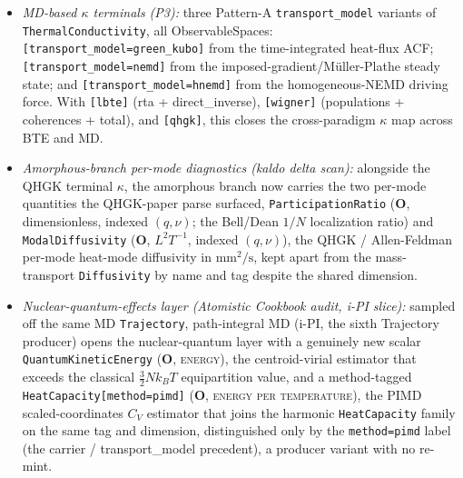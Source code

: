 \documentclass[11pt,a4paper]{article}
\begin{document}
\begin{itemize}[leftmargin=2em, itemsep=0.2em]
  \item \emph{MD-based $\kappa$ terminals (P3):} three Pattern-A
        \texttt{transport\_model} variants of \texttt{ThermalConductivity}, all
        ObservableSpaces: \texttt{[transport\_model=green\_kubo]} from the
        time-integrated heat-flux ACF; \texttt{[transport\_model=nemd]} from
        the imposed-gradient/Müller-Plathe steady state; and
        \texttt{[transport\_model=hnemd]} from the homogeneous-NEMD driving
        force. With \texttt{[lbte]} (rta + direct\_inverse), \texttt{[wigner]}
        (populations + coherences + total), and \texttt{[qhgk]}, this closes
        the cross-paradigm $\kappa$ map across BTE and MD.
  \item \emph{Amorphous-branch per-mode diagnostics (kaldo delta scan):}
        alongside the QHGK terminal $\kappa$, the amorphous branch now carries
        the two per-mode quantities the QHGK-paper parse surfaced,
        \texttt{ParticipationRatio} (\textbf{O}, dimensionless, indexed
        $(q,\nu)$; the Bell/Dean $1/N$ localization ratio) and
        \texttt{ModalDiffusivity} (\textbf{O}, $L^2 T^{-1}$, indexed
        $(q,\nu)$), the QHGK / Allen-Feldman per-mode heat-mode diffusivity in
        $\text{mm}^2/\text{s}$, kept apart from the mass-transport
        \texttt{Diffusivity} by name and tag despite the shared dimension.
  \item \emph{Nuclear-quantum-effects layer (Atomistic Cookbook audit, i-PI
        slice):} sampled off the same MD \texttt{Trajectory}, path-integral MD
        (i-PI, the sixth Trajectory producer) opens the nuclear-quantum layer
        with a genuinely new scalar \texttt{QuantumKineticEnergy} (\textbf{O},
        \textsc{energy}), the centroid-virial estimator that exceeds the
        classical $\tfrac{3}{2}Nk_BT$ equipartition value, and a method-tagged
        \texttt{HeatCapacity[method=pimd]} (\textbf{O},
        \textsc{energy per temperature}), the PIMD scaled-coordinates $C_V$
        estimator that joins the harmonic \texttt{HeatCapacity} family on the
        same tag and dimension, distinguished only by the \texttt{method=pimd}
        label (the carrier / transport\_model precedent), a producer variant
        with no re-mint.
\end{itemize}
\end{document}
